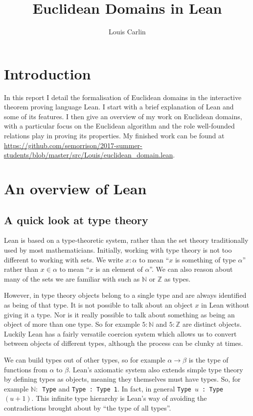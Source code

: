 \documentclass{article}
\author{Louis Carlin}
\title{Euclidean Domains in Lean}
\date{}
\newcommand{\Z}{\ensuremath{\mathbb{Z}}}
\newcommand{\N}{\ensuremath{\mathbb{N}}}
\renewcommand{\a}{\alpha}
\newcommand{\ct}{\texttt}
\begin{document}
\maketitle
\newpage 

\section*{Introduction}
In this report I detail the formalisation of Euclidean domains in the interactive theorem proving language Lean. I start with a brief explanation of Lean and some of its features. I then give an overview of my work on Euclidean domains, with a particular focus on the Euclidean algorithm and the role well-founded relations play in proving its properties. My finished work can be found at \url{https://github.com/semorrison/2017-summer-students/blob/master/src/Louis/euclidean\_domain.lean}.

\section{An overview of Lean}

\subsection{A quick look at type theory}
Lean is based on a type-theoretic system, rather than the set theory traditionally used by most mathematicians. 
Initially, working with type theory is not too different to working with sets. 
We write $x:\a$ to mean ``$x$ is something of type $\a$'' rather than $x \in \a$ to mean ``$x$ is an element of $\a$''. 
We can also reason about many of the sets we are familiar with such as $\N$ or $\Z$ as types.

However, in type theory objects belong to a single type and are always identified as being of that type.
It is not possible to talk about an object $x$ in Lean without giving it a type.
Nor is it really possible to talk about something as being an object of more than one type.
So for example $5:\N$ and $5:\Z$ are distinct objects.
Luckily Lean has a fairly versatile coercion system which allows us to convert between objects of different types, although the process can be clunky at times.

We can build types out of other types, so for example $\a \to \beta$ is the type of functions from $\a$ to $\beta$. 
Lean's axiomatic system also extends simple type theory by defining types as objects, meaning they themselves must have types.
So, for example \ct{$\N:$ Type} and \ct{Type : Type 1}.
In fact, in general \ct{Type $u$ : Type $(u+1)$}. 
This infinite type hierarchy is Lean's way of avoiding the contradictions brought about by ``the type of all types''.
\end{document}
